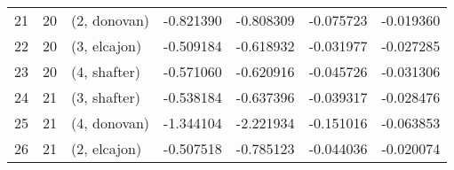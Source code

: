 \begin{tabular}{lllrrrr}
21 &    20 &  (2, donovan) & -0.821390 & -0.808309 &  -0.075723 & -0.019360 \\
22 &    20 &  (3, elcajon) & -0.509184 & -0.618932 &  -0.031977 & -0.027285 \\
23 &    20 &  (4, shafter) & -0.571060 & -0.620916 &  -0.045726 & -0.031306 \\
24 &    21 &  (3, shafter) & -0.538184 & -0.637396 &  -0.039317 & -0.028476 \\
25 &    21 &  (4, donovan) & -1.344104 & -2.221934 &  -0.151016 & -0.063853 \\
26 &    21 &  (2, elcajon) & -0.507518 & -0.785123 &  -0.044036 & -0.020074 \\
\bottomrule
\end{tabular}

